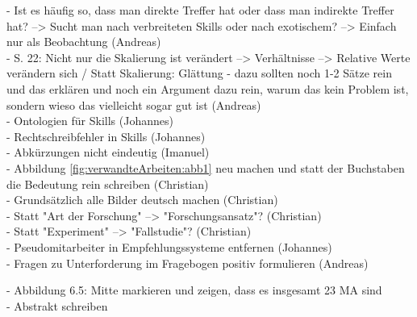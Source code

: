 - Ist es häufig so, dass man direkte Treffer hat oder dass man indirekte Treffer hat? --> Sucht man nach verbreiteten Skills oder nach exotischem? --> Einfach nur als Beobachtung (Andreas)\\
- S. 22: Nicht nur die Skalierung ist verändert --> Verhältnisse --> Relative Werte verändern sich / Statt Skalierung: Glättung - dazu sollten noch 1-2 Sätze rein und das erklären und noch ein Argument dazu rein, warum das kein Problem ist, sondern wieso das vielleicht sogar gut ist (Andreas)\\
- Ontologien für Skills (Johannes)\\
- Rechtschreibfehler in Skills (Johannes)\\
- Abkürzungen nicht eindeutig (Imanuel)\\
- Abbildung \ref{fig:verwandteArbeiten:abb1} neu machen und statt der Buchstaben die Bedeutung rein schreiben (Christian)\\
- Grundsätzlich alle Bilder deutsch machen (Christian)\\
- Statt "Art der Forschung" --> "Forschungsansatz"? (Christian)\\
- Statt "Experiment" --> "Fallstudie"? (Christian)\\
- Pseudomitarbeiter in Empfehlungssysteme entfernen (Johannes)\\
- Fragen zu Unterforderung im Fragebogen positiv formulieren (Andreas)

- Abbildung 6.5: Mitte markieren und zeigen, dass es insgesamt 23 MA sind\\
- Abstrakt schreiben
